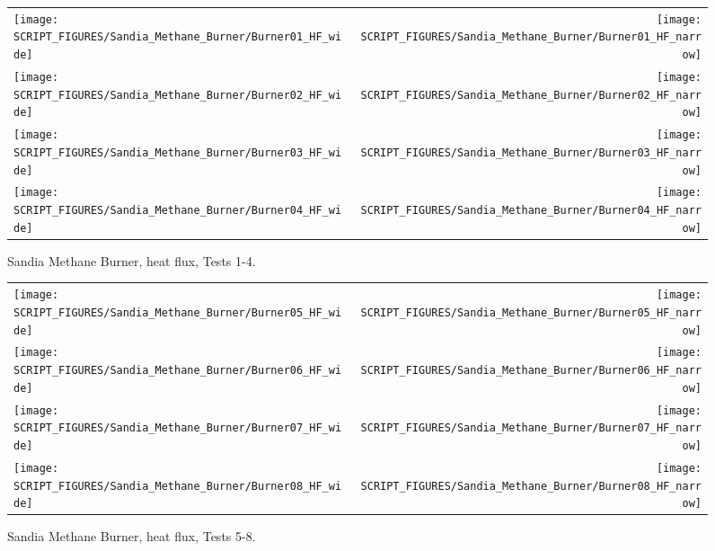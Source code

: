 \newpage

\begin{figure}[p]
\begin{tabular*}{\textwidth}{l@{\extracolsep{\fill}}r}
\texttt{[image: SCRIPT\_FIGURES/Sandia\_Methane\_Burner/Burner01\_HF\_wide]} &
\texttt{[image: SCRIPT\_FIGURES/Sandia\_Methane\_Burner/Burner01\_HF\_narrow]} \\
\texttt{[image: SCRIPT\_FIGURES/Sandia\_Methane\_Burner/Burner02\_HF\_wide]} &
\texttt{[image: SCRIPT\_FIGURES/Sandia\_Methane\_Burner/Burner02\_HF\_narrow]} \\
\texttt{[image: SCRIPT\_FIGURES/Sandia\_Methane\_Burner/Burner03\_HF\_wide]} &
\texttt{[image: SCRIPT\_FIGURES/Sandia\_Methane\_Burner/Burner03\_HF\_narrow]} \\
\texttt{[image: SCRIPT\_FIGURES/Sandia\_Methane\_Burner/Burner04\_HF\_wide]} &
\texttt{[image: SCRIPT\_FIGURES/Sandia\_Methane\_Burner/Burner04\_HF\_narrow]}
\end{tabular*}
\caption[Sandia Methane Burner, heat flux, Tests 1-4] {Sandia Methane Burner, heat flux, Tests 1-4.}
\label{Sandia_Methane_Burner_HF_1}
\end{figure}

\begin{figure}[p]
\begin{tabular*}{\textwidth}{l@{\extracolsep{\fill}}r}
\texttt{[image: SCRIPT\_FIGURES/Sandia\_Methane\_Burner/Burner05\_HF\_wide]} &
\texttt{[image: SCRIPT\_FIGURES/Sandia\_Methane\_Burner/Burner05\_HF\_narrow]} \\
\texttt{[image: SCRIPT\_FIGURES/Sandia\_Methane\_Burner/Burner06\_HF\_wide]} &
\texttt{[image: SCRIPT\_FIGURES/Sandia\_Methane\_Burner/Burner06\_HF\_narrow]} \\
\texttt{[image: SCRIPT\_FIGURES/Sandia\_Methane\_Burner/Burner07\_HF\_wide]} &
\texttt{[image: SCRIPT\_FIGURES/Sandia\_Methane\_Burner/Burner07\_HF\_narrow]} \\
\texttt{[image: SCRIPT\_FIGURES/Sandia\_Methane\_Burner/Burner08\_HF\_wide]} &
\texttt{[image: SCRIPT\_FIGURES/Sandia\_Methane\_Burner/Burner08\_HF\_narrow]}
\end{tabular*}
\caption[Sandia Methane Burner, heat flux, Tests 5-8] {Sandia Methane Burner, heat flux, Tests 5-8.}
\label{Sandia_Methane_Burner_HF_2}
\end{figure}

